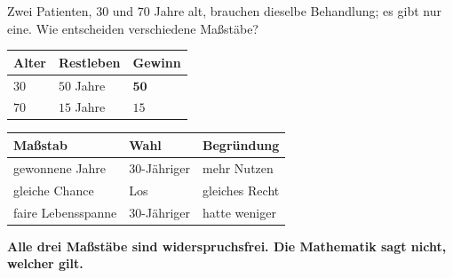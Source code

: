 \begin{aufgabe}
Zwei Patienten, $30$ und $70$ Jahre alt, brauchen dieselbe Behandlung; es gibt nur eine. Wie entscheiden verschiedene Maßstäbe?

\loesung
{}
\begin{center}
{\small
\renewcommand{\arraystretch}{1.48}
\begin{tabular}{@{}P{2.0cm}P{2.4cm}P{2.6cm}@{}}
\toprule
\textbf{Alter} & \textbf{Restleben} & \textbf{Gewinn}\\
\midrule
$30$ & $50$ Jahre & $\mathbf{50}$\\
$70$ & $15$ Jahre & $15$\\
\bottomrule
\end{tabular}}
\end{center}

\begin{center}
{\small
\renewcommand{\arraystretch}{1.5}
\begin{tabular}{@{}P{2.8cm}P{2.4cm}P{2.6cm}@{}}
\toprule
\textbf{Maßstab} & \textbf{Wahl} & \textbf{Begründung}\\
\midrule
gewonnene Jahre & $30$-Jähriger & mehr Nutzen\\
gleiche Chance & Los & gleiches Recht\\
faire Lebensspanne & $30$-Jähriger & hatte weniger\\
\bottomrule
\end{tabular}}
\end{center}

\begin{center}
\begin{minipage}{0.88\textwidth}
\end{minipage}
\end{center}

\begin{center}
\begin{minipage}{0.9\textwidth}
\textbf{Alle drei Maßstäbe sind widerspruchsfrei. Die Mathematik sagt nicht, welcher gilt.}
\end{minipage}
\end{center}
\end{aufgabe}

